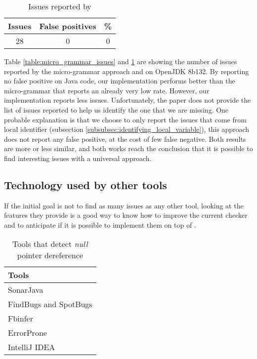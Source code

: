 \begin{table}[h]
	\centering
	\caption{Issues reported by \slang{}}
	\label{table:slang_issues_jdk8}
	\begin{tabular}{|c|c|c|}
		\hline
		\bf Issues & \bf False positives & \bf \% \\ \hline
		28 &  0 &  0 \\ \hline
	\end{tabular}
\end{table}

Table \ref{table:micro_grammar_issues} and \ref{table:slang_issues_jdk8} are showing the number of issues reported by the micro-grammar approach and \slang{} on OpenJDK 8b132.
By reporting no false positive on Java code, our implementation performs better than the micro-grammar that reports an already very low rate.
However, our implementation reports less issues.
Unfortunately, the paper does not provide the list of issues reported to help us identify the one that we are missing.
One probable explanation is that we choose to only report the issues that come from local identifier (subsection \ref{subsubsec:identifying_local_variable}), this approach does not report any false positive, at the cost of few false negative.
Both results are more or less similar, and both works reach the conclusion that it is possible to find interesting issues with a universal approach.

\subsection{Technology used by other tools}
\label{subsec:other_tools_technology}

If the initial goal is not to find as many issues as any other tool, looking at the features they provide is a good way to know how to improve the current checker and to anticipate if it is possible to implement them on top of \slang{}.

\begin{table}[h]
	\centering
	\caption{Tools that detect \emph{null} pointer dereference}
	\label{table:tools_features}
	\begin{tabular}{|l|}
		\hline
		\bf Tools \\
		\hline
		SonarJava \cite{SonarJava:2019:Online} \\
		FindBugs \cite{Hovemeyer:2004:FBE:1052883.1052895} and SpotBugs \cite{spotBugs:2019:Online} \\
		Fbinfer \cite{fbInfer:2019:Online} \\
		ErrorProne \cite{errorProne:2019:Online} \\
		IntelliJ IDEA \cite{intelJIDEA:2019:Online} \\
		\hline    
	\end{tabular}
\end{table}

